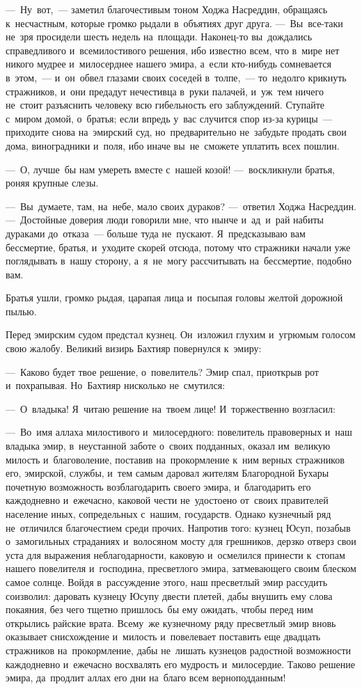 \documentclass[12pt,a4paper]{book}
\begin{document}
—~Ну~вот,~— заметил благочестивым тоном Ходжа Насреддин, обращаясь к~несчастным, которые громко рыдали в~объятиях друг друга. —~Вы~все-таки не~зря просидели шесть недель на~площади. Наконец-то вы~дождались справедливого и~всемилостивого решения, ибо известно всем, что в~мире нет никого мудрее и~милосерднее нашего эмира, а~если кто-нибудь сомневается в~этом,~— и~он~обвел глазами своих соседей в~толпе,~— то~недолго крикнуть стражников, и~они предадут нечестивца в~руки палачей, и~уж~тем ничего не~стоит разъяснить человеку всю гибельность его заблуждений. Ступайте с~миром домой, о~братья; если впредь у~вас случится спор из-за курицы~— приходите снова на~эмирский суд, но~предварительно не~забудьте продать свои дома, виноградники и~поля, ибо иначе вы~не~сможете уплатить всех пошлин.

—~О, лучше~бы нам умереть вместе с~нашей козой! —~воскликнули братья, роняя крупные слезы.

—~Вы~думаете, там, на~небе, мало своих дураков? —~ответил Ходжа Насреддин. —~Достойные доверия люди говорили мне, что нынче и~ад~и~рай набиты дураками до~отказа~— больше туда не~пускают. Я~предсказываю вам бессмертие, братья, и~уходите скорей отсюда, потому что стражники начали уже поглядывать в~нашу сторону, а~я~не~могу рассчитывать на~бессмертие, подобно вам.

Братья ушли, громко рыдая, царапая лица и~посыпая головы желтой дорожной пылью.

Перед эмирским судом предстал кузнец. Он~изложил глухим и~угрюмым голосом свою жалобу. Великий визирь Бахтияр повернулся к~эмиру:

—~Каково будет твое решение, о~повелитель? Эмир спал, приоткрыв рот и~похрапывая. Но~Бахтияр нисколько не~смутился:

—~О~владыка! Я~читаю решение на~твоем лице! И~торжественно возгласил:

—~Во~имя аллаха милостивого и~милосердного: повелитель правоверных и~наш владыка эмир, в~неустанной заботе о~своих подданных, оказал им~великую милость и~благоволение, поставив на~прокормление к~ним верных стражников его, эмирской, службы, и~тем самым даровал жителям Благородной Бухары почетную возможность возблагодарить своего эмира, и~благодарить его каждодневно и~ежечасно, каковой чести не~удостоено от~своих правителей население иных, сопредельных с~нашим, государств. Однако кузнечный ряд не~отличился благочестием среди прочих. Напротив того: кузнец Юсуп, позабыв о~замогильных страданиях и~волосяном мосту для грешников, дерзко отверз свои уста для выражения неблагодарности, каковую и~осмелился принести к~стопам нашего повелителя и~господина, пресветлого эмира, затмевающего своим блеском самое солнце. Войдя в~рассуждение этого, наш пресветлый эмир рассудить соизволил: даровать кузнецу Юсупу двести плетей, дабы внушить ему слова покаяния, без чего тщетно пришлось~бы ему ожидать, чтобы перед ним открылись райские врата. Всему~же кузнечному ряду пресветлый эмир вновь оказывает снисхождение и~милость и~повелевает поставить еще двадцать стражников на~прокормление, дабы не~лишать кузнецов радостной возможности каждодневно и~ежечасно восхвалять его мудрость и~милосердие. Таково решение эмира, да~продлит аллах его дни на~благо всем верноподданным!
\end{document}
